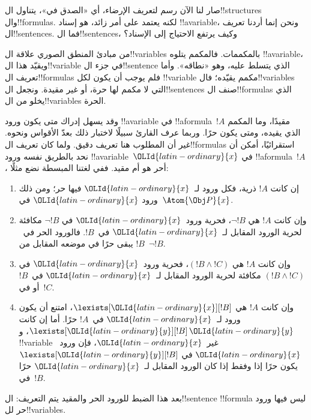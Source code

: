 \documentclass[../../../include/open-logic-section]{subfiles}
\begin{document}


صار لنا الآن رسم لتعريف الإرضاء، أي «الصدق في»، يتناول
ال!!{structure}s وال!!{formula}s. لكنه يعتمد على أمر زائد، هو
إسناد !!a{variable}، ونحن إنما أردنا تعريف ال!!{sentence}s.
فما ال!!{sentence}s، وكيف يرتفع الاحتياج إلى الإسناد؟

من مبادئ المنطق الصوري علاقة ال!!{variable}s بالمكممات. فالمكمم
يتلوه !!a{variable}، ويقيّد هذا ال!!{variable} في جزء
ال!!{sentence} الذي يتسلط عليه، وهو «نطاقه». وأما تعريف
ال!!{formula}s فلم يوجب أن يكون لكل !!{variable} مكمم يقيّده؛
فال!!{variable}s التي لا مكمم لها حرة، أو غير مقيدة. ونجعل
ال!!{sentence}s صنف ال!!{formula}s الذي يخلو من
ال!!{variable}s الحرة.

وقد يسهل إدراك متى يكون ورود !!a{variable} في
!!a{formula}~$!A$ مقيدًا، وما المكمم الذي يقيده، ومتى يكون حرًا.
وربما عرف القارئ سبيلًا لاختبار ذلك بعدّ الأقواس ونحوه. غير أن
المطلوب هنا تعريف دقيق. ولما كان تعريف ال!!{formula}s استقرائيًا،
أمكن أن نحد بالطريق نفسه ورود !!a{variable}~$\OLId{latin-ordinary}{x}$ في
!!a{formula}~$!A$، أحر هو أم مقيد. ففي لغتنا المبسطة نضع مثلًا:
\begin{enumerate}
  \item إن كانت $!A$ ذرية، فكل ورود لـ~$\OLId{latin-ordinary}{x}$ فيها حر؛ ومن ذلك ورود
  $\OLId{latin-ordinary}{x}$ في~$\Atom{\Obj P}{x}$.
  \item وإن كانت $!A$ هي $\lnot !B$، فحرية ورود~$\OLId{latin-ordinary}{x}$ في
  $\lnot !B$ مكافئة لحرية الورود المقابل لـ~$\OLId{latin-ordinary}{x}$ في~$!B$.
  فالورود الحر في~$!B$ يبقى حرًا في موضعه المقابل من~$\lnot !B$.
  \item وإن كانت $!A$ هي $(!B \land !C)$، فحرية ورود~$\OLId{latin-ordinary}{x}$ في
  $(!B \land !C)$ مكافئة لحرية الورود المقابل لـ~$\OLId{latin-ordinary}{x}$
  في~$!B$ أو في~$!C$.
  \item وإن كانت $!A$ هي $\lexists[\OLId{latin-ordinary}{x}][!B]$، امتنع أن يكون ورود
  لـ~$\OLId{latin-ordinary}{x}$ في~$!A$ حرًا. أما إن كانت $\lexists[\OLId{latin-ordinary}{y}][!B]$، و$\OLId{latin-ordinary}{y}$
  !!{variable} غير~$\OLId{latin-ordinary}{x}$، فإن ورود~$\OLId{latin-ordinary}{x}$ في $\lexists[\OLId{latin-ordinary}{y}][!B]$
  يكون حرًا إذا وفقط إذا كان الورود المقابل لـ~$\OLId{latin-ordinary}{x}$ حرًا في~$!B$.
\end{enumerate}

بعد هذا الضبط للورود الحر والمقيد يتم التعريف: ال!!{sentence}
!!{formula} ليس فيها ورود حر لل!!{variable}s.
\end{document}
